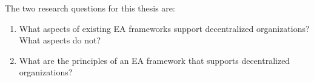 The two research questions for this thesis are:

\begin{enumerate}
\item What aspects of existing EA frameworks support decentralized organizations? What aspects do not?
\label{req:1}
\item What are the principles of an EA framework that supports decentralized organizations?
\label{req:2}
\end{enumerate}
